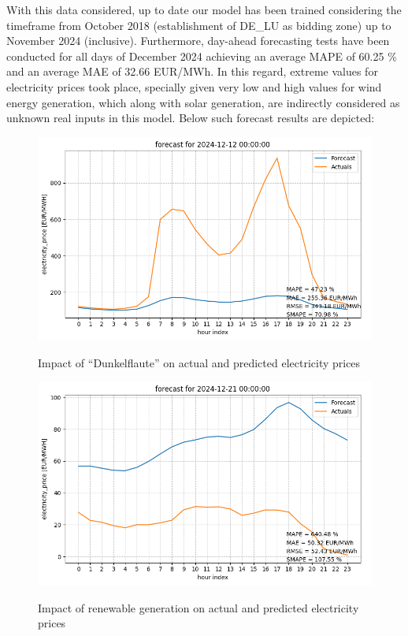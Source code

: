 \documentclass[a4paper]{article}
\begin{document}
    With this data considered, up to date our model has been trained
considering the timeframe from October 2018 (establishment of DE\_LU as
bidding zone) up to November 2024 (inclusive). Furthermore, day-ahead
forecasting tests have been conducted for all days of December 2024
achieving an average MAPE of 60.25 \% and an average MAE of 32.66
EUR/MWh. In this regard, extreme values for electricity prices took
place, specially given very low and high values for wind energy
generation, which along with solar generation, are indirectly considered
as unknown real inputs in this model. Below such forecast results are
depicted:

    \begin{figure}
\centering
{\includegraphics[keepaspectratio]{src/max_mae.png}}
\caption{Impact of ``Dunkelflaute'' on actual and predicted electricity
prices}
\end{figure}

    \begin{figure}
\centering
{\includegraphics[keepaspectratio]{src/max_mape.png}}
\caption{Impact of renewable generation on actual and predicted
electricity prices}
\end{figure}
\end{document}
